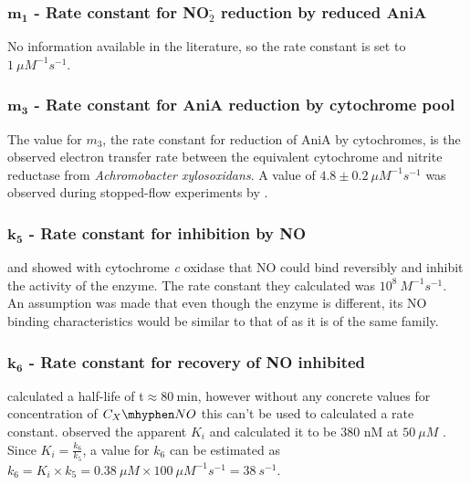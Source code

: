 \subsubsection*{$\mathbf{m_1}$ {\bf- Rate constant for NO$_{\textrm{2}}^{\textrm{-}}$ reduction by reduced AniA}}
No information available in the literature, so the rate constant is set to $1~\mu M^{-1}s^{-1}$.

\subsubsection*{$\mathbf{m_3}$ {\bf- Rate constant for AniA reduction by cytochrome pool}}
The value for $m_3$, the rate constant for reduction of AniA by cytochromes, is the observed electron transfer rate between the equivalent cytochrome and nitrite reductase from \textit{Achromobacter xylosoxidans}. A value of $4.8\pm0.2~\mu M^{-1}s^{-1}$ was observed during stopped-flow experiments by \citet{Nojiri2009}.

\subsubsection*{$\mathbf{k_5}$ {\bf- Rate constant for \cbbthree{} inhibition by NO}}
\citet{Giuffre2000} and \citet{Blackmore1991} showed with cytochrome \textit{c} oxidase that NO could bind reversibly and inhibit the activity of the enzyme. The rate constant they calculated was $10^8~M ^{-1} s ^{-1}$. An assumption was made that even though the enzyme is different, its NO binding characteristics would be similar to that of \cbbthree{} as it is of the same family.

\subsubsection*{$\mathbf{k_6}$ {\bf- Rate constant for recovery of NO inhibited \cbbthree{}}}
\citet{Giuffre2000} calculated a half-life of t\textonehalf $\approx 80~\mathrm{min}$, however without any concrete values for concentration of $C_X\mhyphen NO$ this can't be used to calculated a rate constant.
\citet{Rock2005} observed the apparent $K_i$ and calculated it to be 380 nM at $50~\mu M$ \cOxygen{}. Since $K_i = \frac{k_6}{k_5}$, a value for $k_6$ can be estimated as $k_6 = K_i \times k_5 = 0.38~\mu M \times 100~\mu M^{-1}s^{-1} = 38~s^{-1}$.

